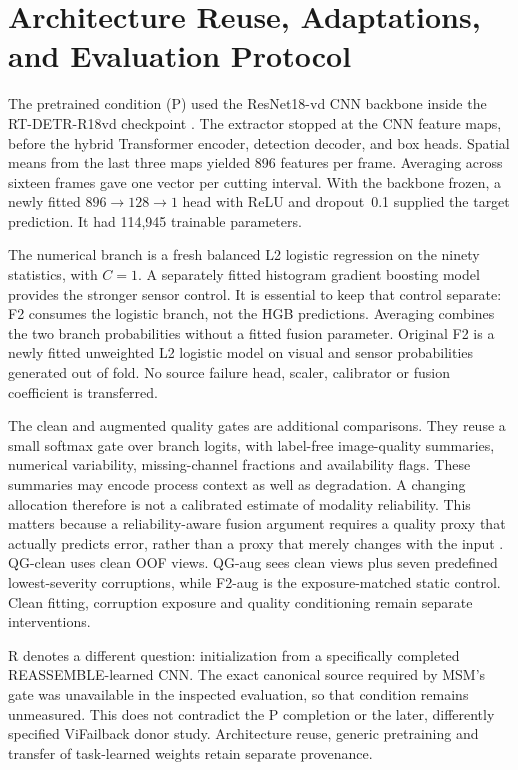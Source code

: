 \section{Architecture Reuse, Adaptations, and Evaluation Protocol}
The pretrained condition (P) used the ResNet18-vd CNN backbone inside the RT-DETR-R18vd
checkpoint \citep{Zhao2024RTDETR}. The extractor stopped at the CNN feature maps, before
the hybrid Transformer encoder, detection decoder, and box heads. Spatial means from the
last three maps yielded 896 features per frame. Averaging across sixteen frames gave one
vector per cutting interval. With the backbone frozen, a newly fitted
$896\rightarrow128\rightarrow1$ head with ReLU and dropout~0.1 supplied the target
prediction. It had 114,945 trainable parameters.

The numerical branch is a fresh balanced L2 logistic regression on the ninety
statistics, with $C=1$. A separately fitted histogram gradient boosting model provides
the stronger sensor control. It is essential to keep that control separate: F2 consumes
the logistic branch, not the HGB predictions. Averaging combines the two branch
probabilities without a fitted fusion parameter. Original F2 is a newly fitted
unweighted L2 logistic model on visual and sensor probabilities generated out of fold.
No source failure head, scaler, calibrator or fusion coefficient is transferred.

The clean and augmented quality gates are additional comparisons. They reuse a small
softmax gate over branch logits, with label-free image-quality summaries, numerical
variability, missing-channel fractions and availability flags. These summaries may
encode process context as well as degradation. A changing allocation therefore is not a
calibrated estimate of modality reliability. This matters because a reliability-aware
fusion argument requires a quality proxy that actually predicts error, rather than a
proxy that merely changes with the input \citep{Zhang2023QMF}. QG-clean uses clean OOF
views. QG-aug sees clean views plus seven predefined lowest-severity corruptions, while
F2-aug is the exposure-matched static control. Clean fitting, corruption exposure and
quality conditioning remain separate interventions.

R denotes a different question: initialization from a specifically completed
REASSEMBLE-learned CNN. The exact canonical source required by MSM's gate was
unavailable in the inspected evaluation, so that condition remains unmeasured. This does
not contradict the P completion or the later, differently specified ViFailback donor
study. Architecture reuse, generic pretraining and transfer of task-learned weights
retain separate provenance.

